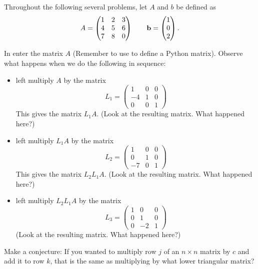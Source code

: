 Throughout the following several problems, let $A$ and $b$ be defined as
\[ A = \begin{pmatrix} 1 & 2 & 3 \\ 4 & 5 & 6 \\ 7 & 8 & 0 \end{pmatrix} \qquad {\bf b} =
\begin{pmatrix} 1 \\ 0 \\ 2 \end{pmatrix}. \]
\begin{problem}
    In \ProgLang enter the matrix $A$ \ifnum{}(Remember to use  to define a Python matrix)\fi.  Observe what happens when we do the
    following in sequence:
    \begin{itemize}
        \item left multiply $A$ by the matrix
            \[ L_1 = \begin{pmatrix} 1 & 0 & 0 \\ -4 & 1 & 0 \\ 0 & 0 & 1 \end{pmatrix} \]
            This gives the matrix $L_1 A$.  (Look at the resulting matrix.  What happened here?)
        \item left multiply $L_1 A$ by the matrix
            \[ L_2 = \begin{pmatrix} 1 & 0 & 0 \\ 0 & 1 & 0 \\ -7 & 0 & 1 \end{pmatrix} \]
            This gives the matrix $L_2 L_1 A$.  (Look at the resulting matrix.  What happened here?)
        \item left multiply $L_2 L_1 A$ by the matrix 
            \[ L_3 = \begin{pmatrix} 1 & 0 & 0 \\ 0 & 1 & 0 \\ 0 & -2 & 1 \end{pmatrix} \]
            (Look at the resulting matrix.  What happened here?)
    \end{itemize}
\end{problem}

\begin{problem}
    Make a conjecture: If you wanted to multiply row $j$ of an $n\times n$ matrix by $c$
    and add it to row $k$, that is the same as multiplying by what lower triangular
    matrix?
\end{problem}

